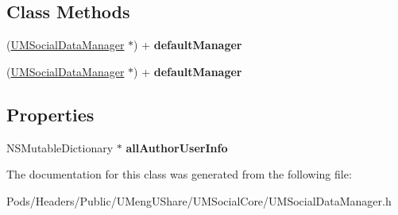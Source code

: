 \subsection*{Class Methods}
\begin{DoxyCompactItemize}
\item 
\mbox{\label{interface_u_m_social_data_manager_a141ec055accd4ade25e55d2bd2434c32}} 
(\mbox{\hyperlink{interface_u_m_social_data_manager}{U\+M\+Social\+Data\+Manager}} $\ast$) + {\bfseries default\+Manager}
\item 
\mbox{\label{interface_u_m_social_data_manager_a141ec055accd4ade25e55d2bd2434c32}} 
(\mbox{\hyperlink{interface_u_m_social_data_manager}{U\+M\+Social\+Data\+Manager}} $\ast$) + {\bfseries default\+Manager}
\end{DoxyCompactItemize}
\subsection*{Properties}
\begin{DoxyCompactItemize}
\item 
\mbox{\label{interface_u_m_social_data_manager_a184170d76a347399e3f52e63c62ab87b}} 
N\+S\+Mutable\+Dictionary $\ast$ {\bfseries all\+Author\+User\+Info}
\end{DoxyCompactItemize}


The documentation for this class was generated from the following file\+:\begin{DoxyCompactItemize}
\item 
Pods/\+Headers/\+Public/\+U\+Meng\+U\+Share/\+U\+M\+Social\+Core/U\+M\+Social\+Data\+Manager.\+h\end{DoxyCompactItemize}
